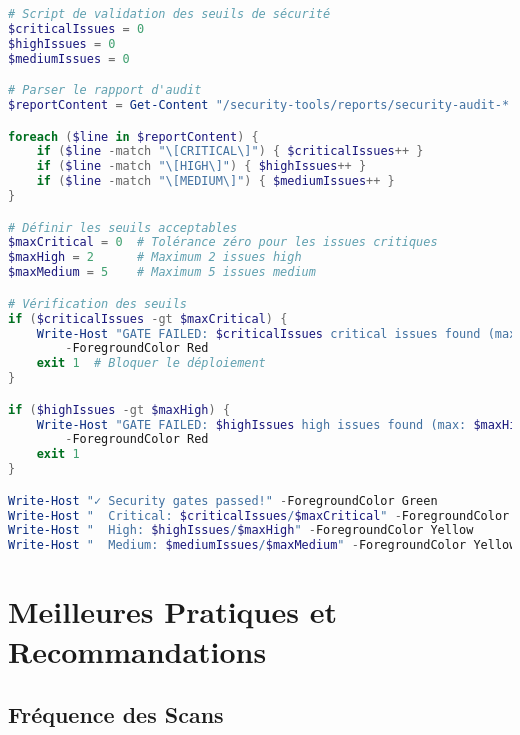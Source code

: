 \documentclass[11pt,a4paper]{report}
\begin{document}
\begin{lstlisting}[language=PowerShell, caption=Validation des Quality Gates, basicstyle=\ttfamily\tiny]
# Script de validation des seuils de sécurité
$criticalIssues = 0
$highIssues = 0
$mediumIssues = 0

# Parser le rapport d'audit
$reportContent = Get-Content "/security-tools/reports/security-audit-*.txt"

foreach ($line in $reportContent) {
    if ($line -match "\[CRITICAL\]") { $criticalIssues++ }
    if ($line -match "\[HIGH\]") { $highIssues++ }
    if ($line -match "\[MEDIUM\]") { $mediumIssues++ }
}

# Définir les seuils acceptables
$maxCritical = 0  # Tolérance zéro pour les issues critiques
$maxHigh = 2      # Maximum 2 issues high
$maxMedium = 5    # Maximum 5 issues medium

# Vérification des seuils
if ($criticalIssues -gt $maxCritical) {
    Write-Host "GATE FAILED: $criticalIssues critical issues found (max: $maxCritical)" `
        -ForegroundColor Red
    exit 1  # Bloquer le déploiement
}

if ($highIssues -gt $maxHigh) {
    Write-Host "GATE FAILED: $highIssues high issues found (max: $maxHigh)" `
        -ForegroundColor Red
    exit 1
}

Write-Host "✓ Security gates passed!" -ForegroundColor Green
Write-Host "  Critical: $criticalIssues/$maxCritical" -ForegroundColor Green
Write-Host "  High: $highIssues/$maxHigh" -ForegroundColor Yellow
Write-Host "  Medium: $mediumIssues/$maxMedium" -ForegroundColor Yellow
\end{lstlisting}


\chapter{Meilleures Pratiques et Recommandations}

\section{Fréquence des Scans}
\end{document}
